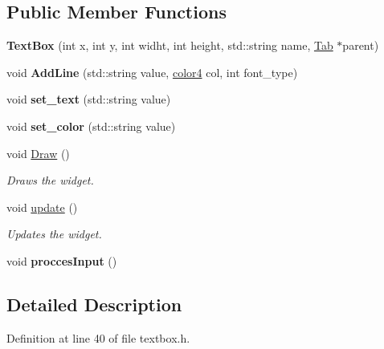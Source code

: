 \subsection*{Public Member Functions}
\begin{DoxyCompactItemize}
\item 
\mbox{\label{class_text_box_a2af00dafe8bb6bb4622bc86b603a4232}} 
{\bfseries Text\+Box} (int x, int y, int widht, int height, std\+::string name, \hyperlink{class_tab}{Tab} $\ast$parent)
\item 
\mbox{\label{class_text_box_abe4adac39342599efed1c338ba41deba}} 
void {\bfseries Add\+Line} (std\+::string value, \hyperlink{structcolor4}{color4} col, int font\+\_\+type)
\item 
\mbox{\label{class_text_box_a501ae53e5c95b83ef4f613a98ed43b1a}} 
void {\bfseries set\+\_\+text} (std\+::string value)
\item 
\mbox{\label{class_text_box_a9d710a27f795e07deffcde1a0e700d0c}} 
void {\bfseries set\+\_\+color} (std\+::string value)
\item 
void \hyperlink{class_text_box_ad0d6ca66198e14fec70ff2f891034f0c}{Draw} ()
\begin{DoxyCompactList}\small\item\em Draws the widget. \end{DoxyCompactList}\item 
void \hyperlink{class_text_box_afa0bba711f542abe6c4d304fe2773cd9}{update} ()
\begin{DoxyCompactList}\small\item\em Updates the widget. \end{DoxyCompactList}\item 
\mbox{\label{class_text_box_a25d2da575467ef88b9266341eeb0362d}} 
void {\bfseries procces\+Input} ()
\end{DoxyCompactItemize}


\subsection{Detailed Description}


Definition at line 40 of file textbox.\+h.



